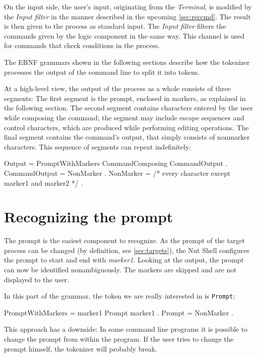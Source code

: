 \documentclass[paper=a4,twoside,abstract=on,cleardoublepage=empty,numbers=noenddot,toc=bib,toc=listof,12pt,appendixprefix=true]{scrreprt}
\begin{document}
On the input side, the user's input, originating from the \emph{Terminal}, is modified by the \emph{Input filter} in the manner described in the upcoming \cref{sec:reccmd}. The result is then given to the process as standard input. The \emph{Input filter} filters the commands given by the logic component in the same way. This channel is used for commands that check conditions in the process.

The \textsc{EBNF} grammars shown in the following sections describe how the tokenizer processes the output of the command line to split it into tokens.

At a high-level view, the output of the process as a whole consists of three segments:
The first segment is the prompt, enclosed in markers, as explained in the following section.
The second segment contains characters entered by the user while composing the command; the segment may include escape sequences and control characters, which are produced while performing editing operations.
The final segment contains the command's output, that simply consists of nonmarker characters.
This sequence of segments can repeat indefinitely:

\begin{ebnf}
Output = { PromptWithMarkers CommandComposing CommandOutput } .
CommandOutput = { NonMarker } .
NonMarker = /* every character except marker1 and marker2 */ .
\end{ebnf}

\section{Recognizing the prompt}

The prompt is the easiest component to recognize. As the prompt of the target process can be changed (by definition, see \cref{sec:targets}), the Nut Shell configures the prompt to start and end with \emph{marker1}. Looking at the output, the prompt can now be identified nonambiguously. The markers are skipped and are not displayed to the user.

In this part of the grammar, the token we are really interested in is \texttt{Prompt}:

\begin{ebnf}
PromptWithMarkers = marker1 Prompt marker1 .
Prompt = { NonMarker } .
\end{ebnf}
%
This approach has a downside: In some command line programs it is possible to change the prompt from within the program. If the user tries to change the prompt himself, the tokenizer will probably break.
\end{document}
